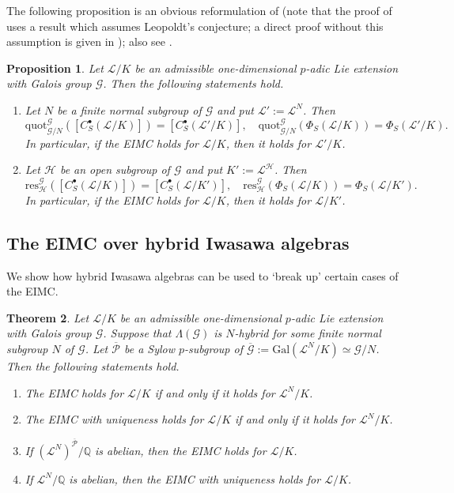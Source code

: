 \documentclass[12pt]{amsart}
\theoremstyle{plain}
\newtheorem{theorem}{Theorem}[section]
\newtheorem{prop}[theorem]{Proposition}
\theoremstyle{remark}
\theoremstyle{definition}
\numberwithin{equation}{section}
\begin{document}
The following proposition is an obvious reformulation of \cite[Proposition 12]{MR2114937}
(note that the proof of \cite[Proposition 12 (1)(a)]{MR2114937} uses a result which assumes Leopoldt's conjecture;
a direct proof without this assumption is given in \cite[Appendix]{MR2813337}); also see
\cite[Proposition 1.6.5]{MR2276851}.

\begin{prop} \label{prop:funtorialities}
Let $\mathcal{L}/K$ be an admissible one-dimensional $p$-adic Lie extension with Galois group $\mathcal{G}$.
Then the following statements hold.
\begin{enumerate}
\item
Let $N$ be a finite normal subgroup of $\mathcal{G}$ and put $\mathcal{L}' := \mathcal{L}^{N}$.
Then
\[
{\mathrm{quot}}^{\mathcal{G}}_{\mathcal{G}/N}([C_{S}^{\bullet}(\mathcal{L}/K)]) = [C_{S}^{\bullet}(\mathcal{L}'/K)], \quad
{\mathrm{quot}}^{\mathcal{G}}_{\mathcal{G}/N}(\Phi_{S}(\mathcal{L}/K)) = \Phi_{S}(\mathcal{L}'/K).
\]
In particular, if the EIMC holds for $\mathcal{L}/K$, then it holds for $\mathcal{L}'/K$.
\item
Let $\mathcal{H}$ be an open subgroup of $\mathcal{G}$ and put $K' := \mathcal{L}^{\mathcal{H}}$. Then
\[
{\mathrm{res}}^{\mathcal{G}}_{\mathcal{H}}([C_{S}^{\bullet}(\mathcal{L}/K)]) = [C_{S}^{\bullet}(\mathcal{L}/K')], \quad
{\mathrm{res}}^{\mathcal{G}}_{\mathcal{H}}(\Phi_{S}(\mathcal{L}/K)) = \Phi_{S}(\mathcal{L}/K').
\]
In particular, if the EIMC holds for $\mathcal{L}/K$, then it holds for $\mathcal{L}/K'$.
\end{enumerate}
\end{prop}

\subsection{The EIMC over hybrid Iwasawa algebras}
We show how hybrid Iwasawa algebras can be used to `break up' certain cases of the EIMC.

\begin{theorem}\label{thm:EIMC-break-down}
Let $\mathcal{L}/K$ be an admissible one-dimensional $p$-adic Lie extension with Galois group $\mathcal{G}$.
Suppose that $\Lambda(\mathcal{G})$ is $N$-hybrid for some
finite normal subgroup $N$ of $\mathcal{G}$.
Let $\overline{\mathcal{P}}$ be a Sylow $p$-subgroup of $\overline{\mathcal{G}}:={\mathrm{Gal}}(\mathcal{L}^{N}/K) \simeq \mathcal{G}/N$.
Then the following statements hold.
\begin{enumerate}
\item The EIMC holds for $\mathcal{L}/K$ if and only if it holds for $\mathcal{L}^{N}/K$.
\item The EIMC with uniqueness holds for $\mathcal{L}/K$ if and only if it holds for $\mathcal{L}^{N}/K$.
\item If $(\mathcal{L}^{N})^{\overline{\mathcal{P}}} / {\mathbb{Q}}$ is abelian, then the EIMC holds for $\mathcal{L}/K$.
\item If $\mathcal{L}^{N} / {\mathbb{Q}}$ is abelian, then the EIMC with uniqueness holds for $\mathcal{L}/K$.
\end{enumerate}
\end{theorem}
\end{document}
